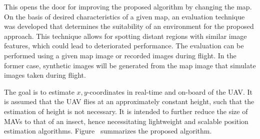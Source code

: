 This opens the door for improving the proposed
algorithm by changing the map. On the basis of desired characteristics
of a given map, an evaluation technique was developed that determines
the suitability of an environment for the proposed approach. This
technique allows for spotting distant regions with similar image
features, which could lead to deteriorated performance. The evaluation
can be performed using a given map image or recorded images during
flight. In the former case, synthetic images will be generated from
the map image that simulate images taken during flight.

The goal is to estimate $x,y$-coordinates in real-time and on-board of the UAV. It is assumed that the UAV flies at an approximately constant height, such that the estimation of height is not necessary.  It is intended to further reduce the size of MAVs to that of an
insect, hence necessitating lightweight and scalable position
estimation algorithms. Figure~\label{fig:highleveloverview} summarizes the proposed algorithm.